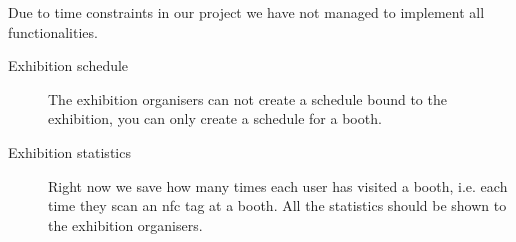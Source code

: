 Due to time constraints in our project we have not managed to implement all functionalities. 

\begin{description}
\item[Exhibition schedule] The exhibition organisers can not create a schedule bound to the exhibition, you can only create a schedule for a booth.%
\item[Exhibition statistics] Right now we save how many times each user has visited a booth, i.e. each time they scan an \ac{nfc} tag at a booth. All the statistics should be shown to the exhibition organisers.


\end{description}
